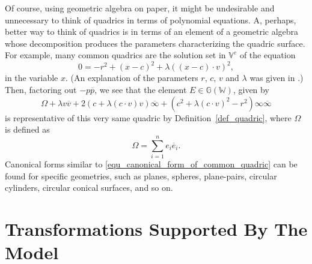 \documentclass{birkjour}
\theoremstyle{definition}
\theoremstyle{remark}
\numberwithin{equation}{section}
\newcommand{\G}{\mathbb{G}}
\newcommand{\V}{\mathbb{V}}
\newcommand{\W}{\mathbb{W}}
\newcommand{\nvai}{\infty}
\newcommand{\nvaib}{\overline{\infty}}
\begin{document}
Of course, using geometric algebra on paper, it might be undesirable and unnecessary to think of
quadrics in terms of polynomial equations.  A, perhaps, better way to think of quadrics is in terms
of an element of a geometric algebra whose decomposition
produces the parameters characterizing the quadric surface.  For example, many common
quadrics are the solution set in $\V^e$ of the equation
\begin{equation}
0 = -r^2 + (x-c)^2 + \lambda((x-c)\cdot v)^2,
\end{equation}
in the variable $x$.  (An explanation of the parameters $r$, $c$, $v$ and $\lambda$
was given in \cite{Parkin12}.)  Then, factoring out $-p\overline{p}$, we see that
the element $E\in\G(\W)$, given by
\begin{equation}\label{equ_canonical_form_of_common_quadric}
\Omega + \lambda v\overline{v}+2(c+\lambda(c\cdot v)v)\nvaib+
(c^2+\lambda (c\cdot v)^2-r^2)\nvai\nvaib
\end{equation}
is representative of this very same quadric by Definition~\ref{def_quadric},
where $\Omega$ is defined as
\begin{equation}
\Omega = \sum_{i=1}^n e_i\overline{e}_i.
\end{equation}
Canonical forms similar to \eqref{equ_canonical_form_of_common_quadric}
can be found for specific geometries, such as planes, spheres, plane-pairs,
circular cylinders, circular conical surfaces, and so on.

\section{Transformations Supported By The Model}
\end{document}
